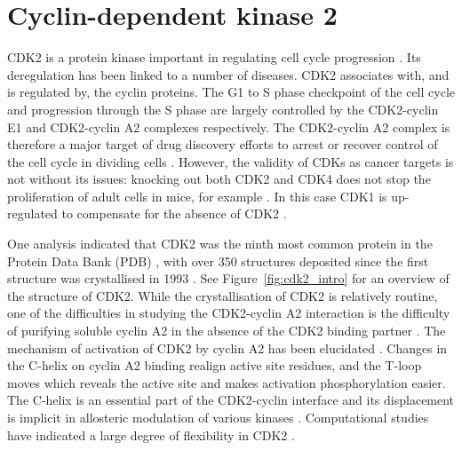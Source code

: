 \section{Cyclin-dependent kinase 2}
\label{sec:introduction_cdk2}

CDK2 is a protein kinase important in regulating cell cycle progression \cite{Peyressatre2015}.
Its deregulation has been linked to a number of diseases.
CDK2 associates with, and is regulated by, the cyclin proteins.
The G1 to S phase checkpoint of the cell cycle and progression through the S phase are largely controlled by the CDK2-cyclin E1 and CDK2-cyclin A2 complexes respectively.
The CDK2-cyclin A2 complex is therefore a major target of drug discovery efforts to arrest or recover control of the cell cycle in dividing cells \cite{Betzi2011}.
However, the validity of CDKs as cancer targets is not without its issues: knocking out both CDK2 and CDK4 does not stop the proliferation of adult cells in mice, for example \cite{Barriere2007}.
In this case CDK1 is up-regulated to compensate for the absence of CDK2 \cite{Diril2012}.

One analysis indicated that CDK2 was the ninth most common protein in the Protein Data Bank (PDB) \cite{Berman2013}, with over 350 structures deposited since the first structure was crystallised in 1993 \cite{DeBondt1993}.
See Figure~\ref{fig:cdk2_intro} for an overview of the structure of CDK2.
While the crystallisation of CDK2 is relatively routine, one of the difficulties in studying the CDK2-cyclin A2 interaction is the difficulty of purifying soluble cyclin A2 in the absence of the CDK2 binding partner \cite{Grigoroudis2015}.
The mechanism of activation of CDK2 by cyclin A2 has been elucidated \cite{Jeffrey1995, Russo1996, Morris2002}.
Changes in the \textalpha C-helix on cyclin A2 binding realign active site residues, and the T-loop moves which reveals the active site and makes activation phosphorylation easier.
The \textalpha C-helix is an essential part of the CDK2-cyclin interface and its displacement is implicit in allosteric modulation of various kinases \cite{Palmieri2013, Child2010}.
Computational studies have indicated a large degree of flexibility in CDK2 \cite{Pisani2016, Gu2007}.


